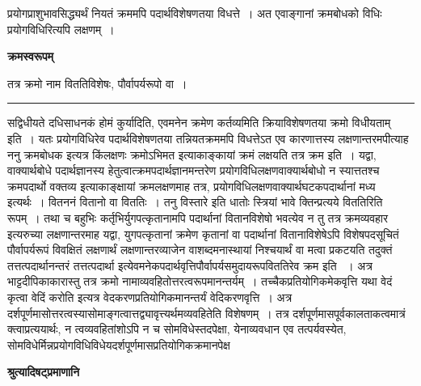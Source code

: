 \documentclass[11pt, openany]{book}
\begin{document}
\newpage
\fancyhead[RE]{[ क्रमस्वरूपम् ] }
{\bl\noindent
प्रयोगप्राशुभावसिद्ध्यर्थं नियतं क्रममपि पदार्थविशेषणतया विधत्ते~। अत एवाङ्गानां क्रमबोधको विधिः प्रयोगविधिरित्यपि लक्षणम्~।}
\begin{center}
 \textbf{क्रमस्वरूपम्}   
\end{center}
 
{\bl तत्र क्रमो नाम विततिविशेषः, पौर्वापर्यरूपो वा~।~}\\
\hrule
\vspace{3mm}
\noindent
{\qt सद्विधीयते दधिसाधनकं होमं कुर्यादिति, एवमनेन क्रमेण कर्तव्यमिति क्रियाविशेषणतया क्रमो विधीयताम्} इति~। यतः प्रयोगविधिरेव पदार्थविशेषणतया तन्नियतक्रममपि विधत्तेऽत एव कारणात्तस्य लक्षणान्तरमपीत्याह\\

 {\br ननु} क्रमबोधक इत्यत्र किंलक्षणः क्रमोऽभिमत इत्याकाङ्कायां क्रमं लक्षयति {\br तत्र क्रम इति~।} यद्वा, वाक्यार्थबोधे पदार्थज्ञानस्य हेतुत्वात्क्रमपदार्थज्ञानमन्तरेण प्रयोगविधिलक्षणवाक्यार्थबोधो न स्यात्ततश्च क्रमपदार्थो वक्तव्य इत्याकाङ्क्षायां क्रमलक्षणमाह तत्र, प्रयोगविधिलक्षणवाक्यार्थघटकपदार्थानां मध्य इत्यर्थः~। वितननं वितानो वा विततिः~। {\qt तनु विस्तारे} इति धातोः स्त्रियां भावे क्तिन्प्रत्यये विततिरिति रूपम्~। तथा च बहुभिः कर्तृभिर्युगपत्कृतानामपि पदार्थानां वितानविशेषो भवत्येव न तु तत्र क्रमव्यवहार इत्यरुच्या लक्षणान्तरमाह यद्वा, युगपत्कृतानां क्रमेण कृतानां वा पदार्थानां वितानाविशेषेऽपि विशेषपदसूचितं पौर्वापर्यरूपं विवक्षितं लक्षणार्थं लक्षणान्तरव्याजेन वाशब्दमनास्थायां निश्चयार्थं वा
मत्वा प्रकटयति तदुक्तं तत्तत्पदार्थानन्तरं तत्तत्पदार्था इत्येवमनेकपदार्थवृत्तिपौर्वापर्यसमुदायरूपविततिरेव क्रम इति
~। अत्र भाट्टदीपिकाकारास्तु तत्र क्रमो नामाव्यवहितोत्तरत्वरूपमानन्तर्यम्~। तच्चैकप्रतियोगिकमेकवृत्ति यथा {\qt वेदं कृत्वा वेदिं करोति} इत्यत्र वेदकरणप्रतियोगिकमानन्तर्यं वेदिकरणवृत्ति~। अत्र दर्शपूर्णमासोत्तरत्वस्यासोमाङ्गत्वात्तद्व्यावृत्त्यर्थमव्यवहितेति विशेषणम्~। तत्र दर्शपूर्णमासपूर्वकालताकत्वमात्रं क्त्वाप्रत्ययार्थः, न त्वव्यवहितांशोऽपि न च सोमविधेस्तदपेक्षा, येनाव्यवधान एव तत्पर्यवस्येत, सोमविधेर्मिन्नप्रयोगविधिविधेयदर्शपूर्णमासप्रतियोगिकक्रमानपेक्ष
\newpage
\fancyhead[LO]{[ श्रुतिलक्षणम् ]}
\begin{center}
 \textbf{श्रुत्यादिषट्प्रमाणानि}   
\end{center}
 
\end{document}
